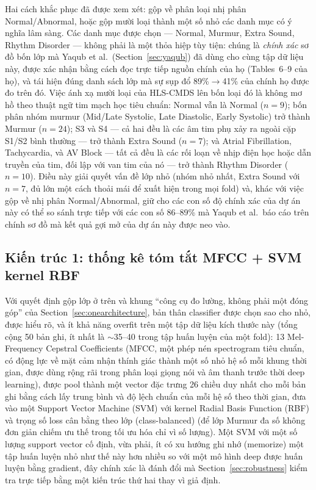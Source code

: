 \documentclass[11pt]{article}
\begin{document}
Hai cách khắc phục đã được xem xét: gộp về phân loại nhị phân
Normal/Abnormal, hoặc gộp mười loại thành một số nhỏ các danh mục có ý
nghĩa lâm sàng. Các danh mục được chọn --- Normal, Murmur, Extra Sound,
Rhythm Disorder --- không phải là một thỏa hiệp tùy tiện: chúng là
\emph{chính xác} sơ đồ bốn lớp mà Yaqub et al.\ (Section~\ref{sec:yaqub})
đã dùng cho cùng tập dữ liệu này, được xác nhận bằng cách đọc trực tiếp
nguồn chính của họ (Tables~6--9 của họ), và tái hiện đúng danh sách lớp
mà sự sụp đổ 89\%$\to$41\% của chính họ được đo trên đó. Việc ánh xạ mười
loại của HLS-CMDS lên bốn loại đó là không mơ hồ theo thuật ngữ tim mạch
học tiêu chuẩn: Normal vẫn là Normal ($n{=}9$); bốn phân nhóm murmur
(Mid/Late Systolic, Late Diastolic, Early Systolic) trở thành Murmur
($n{=}24$); S3 và S4 --- cả hai đều là các âm tim phụ xảy ra ngoài cặp
S1/S2 bình thường --- trở thành Extra Sound ($n{=}7$); và Atrial
Fibrillation, Tachycardia, và AV Block --- tất cả đều là các rối loạn về
nhịp điện học hoặc dẫn truyền của tim, đối lập với van tim của nó ---
trở thành Rhythm Disorder ($n{=}10$). Điều này giải quyết vấn đề lớp
nhỏ (nhóm nhỏ nhất, Extra Sound với $n{=}7$, đủ lớn một cách thoải mái để
xuất hiện trong mọi fold) và, khác với việc gộp về nhị phân
Normal/Abnormal, giữ cho các con số độ chính xác của dự án này có thể so
sánh trực tiếp với các con số 86--89\% mà Yaqub et al.\ báo cáo trên
chính sơ đồ mà kết quả gợi mở của dự án này được neo vào.

\subsection{Kiến trúc 1: thống kê tóm tắt MFCC + SVM kernel RBF}
\label{sec:arch1}

Với quyết định gộp lớp ở trên và khung ``công cụ đo lường, không phải
một đóng góp'' của Section~\ref{sec:onearchitecture}, bản thân classifier
được chọn sao cho nhỏ, được hiểu rõ, và ít khả năng overfit trên một tập
dữ liệu kích thước này (tổng cộng 50 bản ghi, ít nhất là $\sim$35--40
trong tập huấn luyện của một fold): 13 Mel-Frequency Cepstral Coefficients
(MFCC, một phép nén spectrogram tiêu chuẩn, có động lực về mặt cảm nhận
thính giác thành một số nhỏ hệ số mỗi khung thời gian, được dùng rộng rãi
trong phân loại giọng nói và âm thanh trước thời deep learning), được
pool thành một vector đặc trưng 26 chiều duy nhất cho mỗi bản ghi bằng
cách lấy trung bình và độ lệch chuẩn của mỗi hệ số theo thời gian, đưa
vào một Support Vector Machine (SVM) với kernel Radial Basis Function
(RBF) và trọng số loss cân bằng theo lớp (class-balanced) (để lớp Murmur
đa số không đơn giản chiếm ưu thế trong tối ưu hóa chỉ vì số lượng). Một
SVM với một số lượng support vector cố định, vừa phải, ít có xu hướng ghi
nhớ (memorize) một tập huấn luyện nhỏ như thế này hơn nhiều so với một mô
hình deep được huấn luyện bằng gradient, đây chính xác là đánh đổi mà
Section~\ref{sec:robustness} kiểm tra trực tiếp bằng một kiến trúc thứ
hai thay vì giả định.
\end{document}
